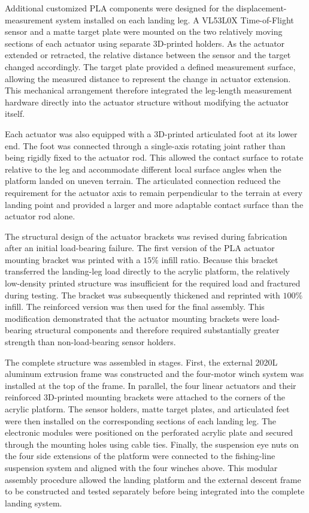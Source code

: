 \documentclass{engr1000j-s2}
\begin{document}
Additional customized PLA components were designed for the displacement-measurement system installed on each landing leg. A VL53L0X Time-of-Flight sensor and a matte target plate were mounted on the two relatively moving sections of each actuator using separate 3D-printed holders. As the actuator extended or retracted, the relative distance between the sensor and the target changed accordingly. The target plate provided a defined measurement surface, allowing the measured distance to represent the change in actuator extension. This mechanical arrangement therefore integrated the leg-length measurement hardware directly into the actuator structure without modifying the actuator itself.

Each actuator was also equipped with a 3D-printed articulated foot at its lower end. The foot was connected through a single-axis rotating joint rather than being rigidly fixed to the actuator rod. This allowed the contact surface to rotate relative to the leg and accommodate different local surface angles when the platform landed on uneven terrain. The articulated connection reduced the requirement for the actuator axis to remain perpendicular to the terrain at every landing point and provided a larger and more adaptable contact surface than the actuator rod alone.

The structural design of the actuator brackets was revised during fabrication after an initial load-bearing failure. The first version of the PLA actuator mounting bracket was printed with a \(15\%\) infill ratio. Because this bracket transferred the landing-leg load directly to the acrylic platform, the relatively low-density printed structure was insufficient for the required load and fractured during testing. The bracket was subsequently thickened and reprinted with \(100\%\) infill. The reinforced version was then used for the final assembly. This modification demonstrated that the actuator mounting brackets were load-bearing structural components and therefore required substantially greater strength than non-load-bearing sensor holders.

The complete structure was assembled in stages. First, the external 2020L aluminum extrusion frame was constructed and the four-motor winch system was installed at the top of the frame. In parallel, the four linear actuators and their reinforced 3D-printed mounting brackets were attached to the corners of the acrylic platform. The sensor holders, matte target plates, and articulated feet were then installed on the corresponding sections of each landing leg. The electronic modules were positioned on the perforated acrylic plate and secured through the mounting holes using cable ties. Finally, the suspension eye nuts on the four side extensions of the platform were connected to the fishing-line suspension system and aligned with the four winches above. This modular assembly procedure allowed the landing platform and the external descent frame to be constructed and tested separately before being integrated into the complete landing system.
\end{document}
